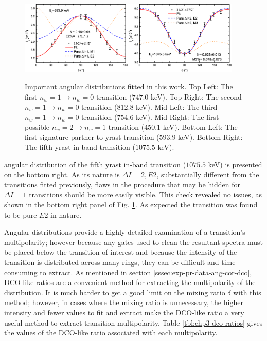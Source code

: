 \begin{figure}[t!]
\centerline{\includegraphics[width=0.475\textwidth]{./img/c4/594Dist_Plot.eps}\hspace{0.04\textwidth}\includegraphics[width=0.475\textwidth]{./img/c4/1075Dist_Plot.eps}}
	\caption{Important angular distributions fitted in this work. Top Left: The first $n_w=1\rightarrow{}n_w=0$ transition ($747.0$ keV). Top Right: The second $n_w=1\rightarrow{}n_w=0$ transition ($812.8$ keV). Mid Left: The third $n_w=1\rightarrow{}n_w=0$ transition ($754.6$ keV). Mid Right: The first possible $n_w=2\rightarrow{}n_w=1$ transition ($450.1$ keV).  Bottom Left: The first signature partner to yrast transition ($593.9$ keV). Bottom Right: The fifth yrast in-band transition ($1075.5$ keV).\label{fig:chp4-angular-distributions}}
\end{figure}
angular distribution of the fifth yrast in-band transition ($1075.5$ keV) is presented on the bottom right. As its nature is $\Delta{}I=2, E2$, substantially different from the transitions fitted previously, flaws in the procedure that may be hidden for $\Delta{}I=1$ transitions should be more easily visible. This check revealed no issues, as shown in the bottom right panel of Fig. \ref{fig:chp4-angular-distributions}. As expected the transition was found to be pure $E2$ in nature.
 
Angular distributions provide a highly detailed examination of a transition's multipolarity; however because any gates used to clean the resultant spectra must be placed below the transition of interest and because the intensity of the transition is distributed across many rings, they can be difficult and time consuming to extract. As mentioned in section \ref{sssec:exp-pr-data-ang-cor-dco}, DCO-like ratios are a convenient method for extracting the multipolarity of the distribution. It is much harder to get a good limit on the mixing ratio $\delta$ with this method; however, in cases where the mixing ratio is unnecessary, the higher intensity and fewer values to fit and extract make the DCO-like ratio a very useful method to extract transition multipolarity. Table \ref{tbl:chp3-dco-ratios} gives the values of the DCO-like ratio associated with each multipolarity. 

